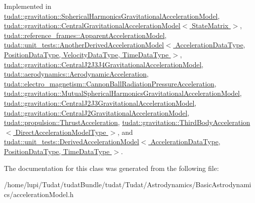Implemented in \hyperlink{classtudat_1_1gravitation_1_1SphericalHarmonicsGravitationalAccelerationModel_a1da9ad8e2fd4daec7c60459175b264f6}{tudat\+::gravitation\+::\+Spherical\+Harmonics\+Gravitational\+Acceleration\+Model}, \hyperlink{classtudat_1_1gravitation_1_1CentralGravitationalAccelerationModel_a9430ea27b71056959af94b2f92353f62}{tudat\+::gravitation\+::\+Central\+Gravitational\+Acceleration\+Model$<$ State\+Matrix $>$}, \hyperlink{classtudat_1_1reference__frames_1_1ApparentAccelerationModel_ae3704bca478d47f8ceb8888a58df5ad9}{tudat\+::reference\+\_\+frames\+::\+Apparent\+Acceleration\+Model}, \hyperlink{classtudat_1_1unit__tests_1_1AnotherDerivedAccelerationModel_add07599d1c34c2479f2271b7703297aa}{tudat\+::unit\+\_\+tests\+::\+Another\+Derived\+Acceleration\+Model$<$ Acceleration\+Data\+Type, Position\+Data\+Type, Velocity\+Data\+Type, Time\+Data\+Type $>$}, \hyperlink{classtudat_1_1gravitation_1_1CentralJ2J3J4GravitationalAccelerationModel_a8cdbef1b4414bf04628e603907aaae1c}{tudat\+::gravitation\+::\+Central\+J2\+J3\+J4\+Gravitational\+Acceleration\+Model}, \hyperlink{classtudat_1_1aerodynamics_1_1AerodynamicAcceleration_a6cd45319bf7f5b7f376aa9357d1840ea}{tudat\+::aerodynamics\+::\+Aerodynamic\+Acceleration}, \hyperlink{classtudat_1_1electro__magnetism_1_1CannonBallRadiationPressureAcceleration_a1e77eb0e4b9f9cfffc1d39e772845fff}{tudat\+::electro\+\_\+magnetism\+::\+Cannon\+Ball\+Radiation\+Pressure\+Acceleration}, \hyperlink{classtudat_1_1gravitation_1_1MutualSphericalHarmonicsGravitationalAccelerationModel_a5924a6d967e6f2168c2dcc9cb8c3d627}{tudat\+::gravitation\+::\+Mutual\+Spherical\+Harmonics\+Gravitational\+Acceleration\+Model}, \hyperlink{classtudat_1_1gravitation_1_1CentralJ2J3GravitationalAccelerationModel_aa9cfafbe11efb4a60bb87ee5c6c06e1a}{tudat\+::gravitation\+::\+Central\+J2\+J3\+Gravitational\+Acceleration\+Model}, \hyperlink{classtudat_1_1gravitation_1_1CentralJ2GravitationalAccelerationModel_a29a5ea148a2db77b0f16809c699d480a}{tudat\+::gravitation\+::\+Central\+J2\+Gravitational\+Acceleration\+Model}, \hyperlink{classtudat_1_1propulsion_1_1ThrustAcceleration_a847904c69ea6ced5ac3396f7ecdf2f78}{tudat\+::propulsion\+::\+Thrust\+Acceleration}, \hyperlink{classtudat_1_1gravitation_1_1ThirdBodyAcceleration_afdb74715179d8da928b1d3616976f795}{tudat\+::gravitation\+::\+Third\+Body\+Acceleration$<$ Direct\+Acceleration\+Model\+Type $>$}, and \hyperlink{classtudat_1_1unit__tests_1_1DerivedAccelerationModel_ae0f1908a1c80dfafc01e4c11e69e1373}{tudat\+::unit\+\_\+tests\+::\+Derived\+Acceleration\+Model$<$ Acceleration\+Data\+Type, Position\+Data\+Type, Time\+Data\+Type $>$}.



The documentation for this class was generated from the following file\+:\begin{DoxyCompactItemize}
\item 
/home/lupi/\+Tudat/tudat\+Bundle/tudat/\+Tudat/\+Astrodynamics/\+Basic\+Astrodynamics/acceleration\+Model.\+h\end{DoxyCompactItemize}

